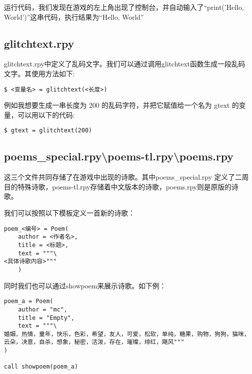 运行代码，我们发现在游戏的左上角出现了控制台，并自动输入了“print('Hello, World')”这串代码，执行结果为“Hello, World”

\subsection{glitchtext.rpy}

glitchtext.rpy中定义了乱码文字。我们可以通过调用glitchtext函数生成一段乱码文字。其使用方法如下:
\begin{lstlisting}
$ <变量名> = glitchtext(<长度>)
\end{lstlisting}


例如我想要生成一串长度为 200 的乱码字符，并把它赋值给一个名为 gtext 的变量，可以用以下的代码:
\begin{lstlisting}
$ gtext = glitchtext(200)
\end{lstlisting}

\subsection{poems\_special.rpy\textbackslash poems-tl.rpy\textbackslash poems.rpy}

这三个文件共同存储了在游戏中出现的诗歌。其中poems\_special.rpy 定义了二周目的特殊诗歌，poems-tl.rpy存储着中文版本的诗歌，poems.rpy则是原版的诗歌。

我们可以按照以下模板定义一首新的诗歌：
\begin{lstlisting}
poem_<编号> = Poem(
    author = <作者名>,
    title = <标题>,
    text = """\
<具体诗歌内容>"""
    )
\end{lstlisting}

同时我们也可以通过showpoem来展示诗歌。如下例：
\begin{lstlisting}
poem_a = Poem(
    author = "mc",
    title = "Empty",
    text = """\
婚姻，热情，童年，快乐，色彩，希望，友人，可爱，松软，单纯，糖果，购物，狗狗，猫咪，云朵，决意，自杀，想象，秘密，活泼，存在，璀璨，绯红，飓风"""
)

call showpoem(poem_a)
\end{lstlisting}